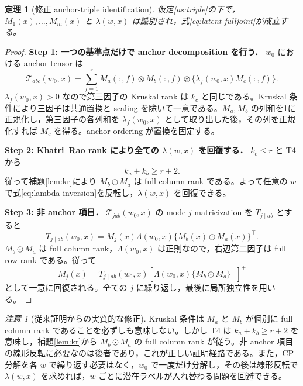\documentclass[11pt,a4paper]{ltjsarticle}
\newtheorem{theorem}{定理}[section]
\theoremstyle{remark}\newtheorem{remark}{注意}[section]
\newcommand{\od}{\odot}
\begin{document}
\begin{theorem}[修正 anchor-triple identification]\label{thm:triple}
仮定\ref{as:triple}の下で，$M_1(x),\ldots,M_m(x)$ と $\lambda(w,x)$ は識別され，式\eqref{eq:latent-fulljoint}が成立する。
\end{theorem}

\begin{proof}
\textbf{Step 1: 一つの基準点だけで anchor decomposition を行う．}
$w_0$ における anchor tensor は
\begin{equation}
\mathcal T_{abc}(w_0,x)
=\sum_{f=1}^rM_a(:,f)\otimes M_b(:,f)\otimes
\{\lambda_f(w_0,x)M_c(:,f)\}.
\label{eq:triple-cp}
\end{equation}
$\lambda_f(w_0,x)>0$ なので第三因子の Kruskal rank は $k_c$ と同じである。Kruskal 条件により三因子は共通置換と scaling を除いて一意である。$M_a,M_b$ の列和を1に正規化し，第三因子の各列和を $\lambda_f(w_0,x)$ として取り出した後，その列を正規化すれば $M_c$ を得る。anchor ordering が置換を固定する。

\textbf{Step 2: Khatri--Rao rank により全ての $\lambda(w,x)$ を回復する．}
$k_c\le r$ と T4 から
\[
k_a+k_b\ge r+2.
\]
従って補題\ref{lem:kr}により $M_b\od M_a$ は full column rank である。よって任意の $w$ で式\eqref{eq:lambda-inversion}を反転し，$\lambda(w,x)$ を回復できる。

\textbf{Step 3: 非 anchor 項目．}
$\mathcal T_{jab}(w_0,x)$ の mode-$j$ matricization を $T_{j\mid ab}$ とすると
\begin{equation}
T_{j\mid ab}(w_0,x)
=M_j(x)\Lambda(w_0,x)\{M_b(x)\od M_a(x)\}^\top.
\end{equation}
$M_b\od M_a$ は full column rank，$\Lambda(w_0,x)$ は正則なので，右辺第二因子は full row rank である。従って
\begin{equation}
M_j(x)=T_{j\mid ab}(w_0,x)
\left[\Lambda(w_0,x)\{M_b\od M_a\}^\top\right]^+
\end{equation}
として一意に回復される。全ての $j$ に繰り返し，最後に局所独立性を用いる。
\end{proof}

\begin{remark}[従来証明からの実質的な修正]
Kruskal 条件は $M_a$ と $M_b$ が個別に full column rank であることを必ずしも意味しない。しかし T4 は $k_a+k_b\ge r+2$ を意味し，補題\ref{lem:kr}から $M_b\od M_a$ の full column rank が従う。非 anchor 項目の線形反転に必要なのは後者であり，これが正しい証明経路である。また，CP 分解を各 $w$ で繰り返す必要はなく，$w_0$ で一度だけ分解し，その後は線形反転で $\lambda(w,x)$ を求めれば，$w$ ごとに潜在ラベルが入れ替わる問題を回避できる。
\end{remark}
\end{document}

